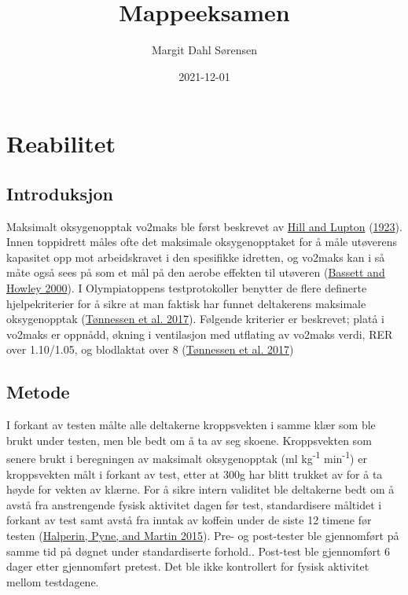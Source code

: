 \documentclass[
]{book}
\title{Mappeeksamen}
\author{Margit Dahl Sørensen}
\date{2021-12-01}
\begin{document}
\frontmatter
\maketitle

\mainmatter
\hypertarget{reabilitet}{%
\chapter{Reabilitet}\label{reabilitet}}

\hypertarget{introduksjon}{%
\section{Introduksjon}\label{introduksjon}}

Maksimalt oksygenopptak vo2maks ble først beskrevet av
\protect\hyperlink{ref-hill1923}{Hill and Lupton}
(\protect\hyperlink{ref-hill1923}{1923}). Innen toppidrett måles ofte
det maksimale oksygenopptaket for å måle utøverens kapasitet opp mot
arbeidskravet i den spesifikke idretten, og vo2maks kan i så måte også
sees på som et mål på den aerobe effekten til utøveren
(\protect\hyperlink{ref-bassett2000}{Bassett and Howley 2000}). I
Olympiatoppens testprotokoller benytter de flere definerte
hjelpekriterier for å sikre at man faktisk har funnet deltakerens
maksimale oksygenopptak
(\protect\hyperlink{ref-tuxf8nnessen2017}{Tønnessen et al. 2017}).
Følgende kriterier er beskrevet; platå i vo2maks er oppnådd, økning i
ventilasjon med utflating av vo2maks verdi, RER over 1.10/1.05, og
blodlaktat over 8 (\protect\hyperlink{ref-tuxf8nnessen2017}{Tønnessen et
al. 2017})

\hypertarget{metode}{%
\section{Metode}\label{metode}}

I forkant av testen målte alle deltakerne kroppsvekten i samme klær som
ble brukt under testen, men ble bedt om å ta av seg skoene. Kroppsvekten
som senere brukt i beregningen av maksimalt oksygenopptak (ml
kg\textsuperscript{-1} min\textsuperscript{-1}) er kroppsvekten målt i
forkant av test, etter at 300g har blitt trukket av for å ta høyde for
vekten av klærne. For å sikre intern validitet ble deltakerne bedt om å
avstå fra anstrengende fysisk aktivitet dagen før test, standardisere
måltidet i forkant av test samt avstå fra inntak av koffein under de
siste 12 timene før testen
(\protect\hyperlink{ref-halperin2015}{Halperin, Pyne, and Martin 2015}).
Pre- og post-tester ble gjennomført på samme tid på døgnet under
standardiserte forhold.. Post-test ble gjennomført 6 dager etter
gjennomført pretest. Det ble ikke kontrollert for fysisk aktivitet
mellom testdagene.
\end{document}
